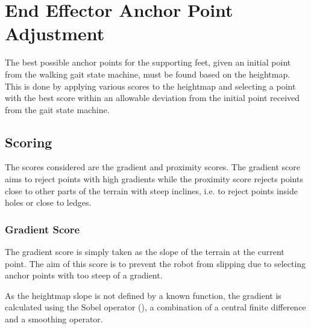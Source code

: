 \chapter{End Effector Anchor Point Adjustment} \label{chap:effector-placement}
The best possible anchor points for the supporting feet, given an initial point from the walking
gait state machine, must be found based on the heightmap. This is done by applying various
scores to the heightmap and selecting a point with the best score within an allowable
deviation from the initial point received from the gait state machine.

\section{Scoring}
    The scores considered are the gradient and proximity scores. The gradient score aims to reject points with high gradients while the proximity score rejects points close
    to other parts of the terrain with steep inclines, i.e. to reject points inside holes or close to ledges.
    \subsection{Gradient Score}
        The gradient score is simply taken as the slope of the terrain at the current point. The aim of this score is to prevent the robot from slipping due to
        selecting anchor points with too steep of a gradient.
        
        As the heightmap slope is not defined by a known function, the gradient is calculated using the Sobel
        operator (\cite{sobel2014}), a combination of a central finite difference and a smoothing operator.
        
